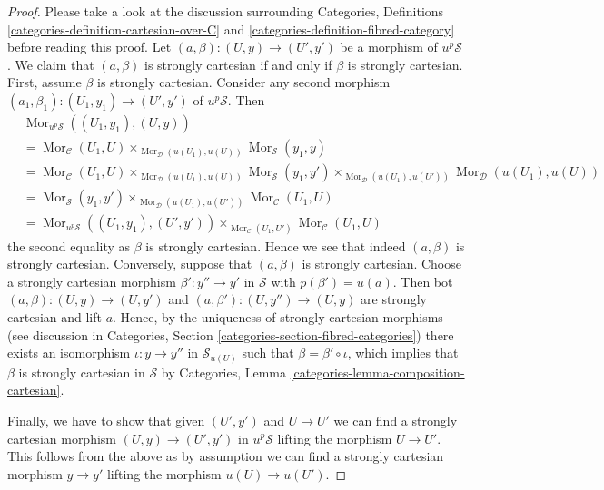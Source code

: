 \documentclass{stacks-project}
\theoremstyle{plain}
\theoremstyle{definition}
\theoremstyle{remark}
\numberwithin{equation}{subsection}
\def\Mor{\mathop{\mathrm{Mor}}\nolimits}
\begin{document}
\begin{proof}
Please take a look at the discussion surrounding
Categories, Definitions \ref{categories-definition-cartesian-over-C} and
\ref{categories-definition-fibred-category}
before reading this proof.
Let $(a, \beta) : (U, y) \to (U', y')$ be a morphism of $u^p\mathcal{S}$.
We claim that $(a, \beta)$ is strongly cartesian if and only if
$\beta$ is strongly cartesian. First, assume $\beta$ is strongly cartesian.
Consider any second morphism
$(a_1, \beta_1) : (U_1, y_1) \to (U', y')$ of $u^p\mathcal{S}$.
Then
\begin{align*}
& \Mor_{u^p\mathcal{S}}((U_1, y_1), (U, y)) \\
& =
\Mor_\mathcal{C}(U_1, U)
\times_{\Mor_\mathcal{D}(u(U_1), u(U))}
\Mor_\mathcal{S}(y_1, y) \\
& =
\Mor_\mathcal{C}(U_1, U)
\times_{\Mor_\mathcal{D}(u(U_1), u(U))}
\Mor_\mathcal{S}(y_1, y')
\times_{\Mor_\mathcal{D}(u(U_1), u(U'))}
\Mor_\mathcal{D}(u(U_1), u(U)) \\
& =
\Mor_\mathcal{S}(y_1, y')
\times_{\Mor_\mathcal{D}(u(U_1), u(U'))}
\Mor_\mathcal{C}(U_1, U) \\
& =
\Mor_{u^p\mathcal{S}}((U_1, y_1), (U', y'))
\times_{\Mor_\mathcal{C}(U_1, U')}
\Mor_\mathcal{C}(U_1, U)
\end{align*}
the second equality as $\beta$ is strongly cartesian. Hence we see that
indeed $(a, \beta)$ is strongly cartesian. Conversely, suppose that
$(a, \beta)$ is strongly cartesian. Choose a strongly cartesian morphism
$\beta' : y'' \to y'$ in $\mathcal{S}$ with $p(\beta') = u(a)$.
Then bot $(a, \beta) : (U, y) \to (U, y')$ and
$(a, \beta') : (U, y'') \to (U, y)$ are strongly cartesian and
lift $a$. Hence, by the uniqueness of strongly cartesian morphisms
(see discussion in
Categories, Section \ref{categories-section-fibred-categories})
there exists an isomorphism $\iota : y \to y''$ in $\mathcal{S}_{u(U)}$
such that $\beta = \beta' \circ \iota$, which implies that
$\beta$ is strongly cartesian in $\mathcal{S}$ by
Categories, Lemma \ref{categories-lemma-composition-cartesian}.

\medskip\noindent
Finally, we have to show
that given $(U', y')$ and $U \to U'$ we can find a strongly
cartesian morphism $(U, y) \to (U', y')$ in $u^p\mathcal{S}$
lifting the morphism $U \to U'$. This follows from the above as by assumption
we can find a strongly cartesian morphism $y \to y'$ lifting the
morphism $u(U) \to u(U')$.
\end{proof}
\end{document}
